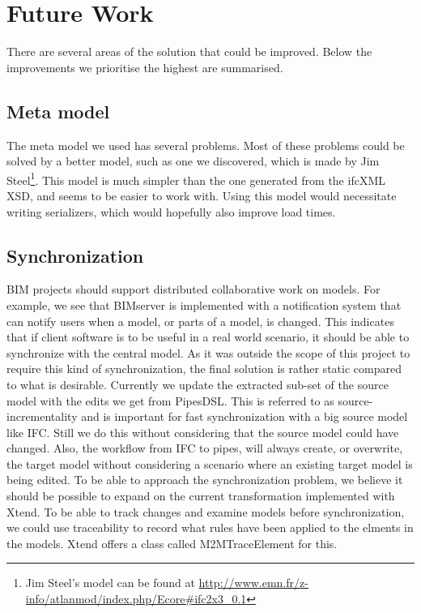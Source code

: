 \section{Future Work}
\label{sec:future_work}
There are several areas of the solution that could be improved. Below the improvements we prioritise the highest are summarised.
\subsection{Meta model}
The meta model we used has several problems. Most of these problems could be solved by a better model, such as one we discovered, which is made by Jim Steel\footnote{Jim Steel's model can be found at \url{http://www.emn.fr/z-info/atlanmod/index.php/Ecore#ifc2x3_0.1}}. This model is much simpler than the one generated from the ifcXML XSD, and seems to be easier to work with. Using this model would necessitate writing serializers, which would hopefully also improve load times.
\subsection{Synchronization}
BIM projects should support distributed collaborative work on models. For example, we see that BIMserver is implemented with a notification system that can notify users when a model, or parts of a model, is changed. This indicates that if client software is to be useful in a real world scenario, it should be able to synchronize with the central model. As it was outside the scope of this project to require this kind of synchronization, the final solution is rather static compared to what is desirable. Currently we update the extracted sub-set of the source model with the edits we get from PipesDSL. This is referred to as source-incrementality \cite[pp. 14]{czarnecki06} and is important for fast synchronization with a big source model like IFC. Still we do this without considering that the source model could have changed. Also, the workflow from IFC to pipes, will always create, or overwrite, the target model without considering a scenario where an existing target model is being edited. To be able to approach the synchronization problem, we believe it should be possible to expand on the current transformation implemented with Xtend. To be able to track changes and examine models before synchronization, we could use traceability to record what rules have been applied to the elments in the models. Xtend offers a class called M2MTraceElement\cite{xtendtrace} for this.


